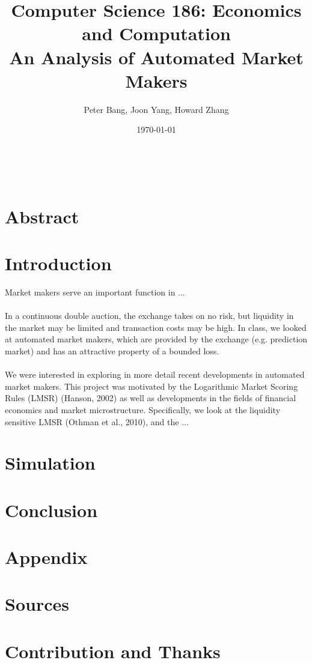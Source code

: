 \documentclass[11pt,a4paper]{article}
\begin{document}
\author{Peter Bang, Joon Yang, Howard Zhang}
\title{Computer Science 186: Economics and Computation \\ An Analysis of Automated Market Makers}
\date{\today}
\maketitle\
\section*{Abstract}
\section*{Introduction}
Market makers serve an important function in ... \\ \\
In a continuous double auction, the exchange takes on no risk, but liquidity in the market may be
limited and transaction costs may be high. In class, we looked at automated market makers, which
are provided by the exchange (e.g. prediction market) and has an attractive property of a bounded
loss. \\ \\ 
We were interested in exploring in more detail recent developments in automated market makers.  This project was motivated by the Logarithmic Market Scoring Rules (LMSR) (Hanson, 2002) as well as developments in the fields of financial economics and market microstructure. Specifically, we look at the liquidity sensitive LMSR (Othman et al., 2010), and the ...
\section*{Simulation}
\section*{Conclusion}
\section*{Appendix}
\section*{Sources}
\section*{Contribution and Thanks}
\end{document}
